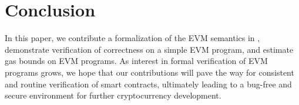 \section{Conclusion}
In this paper, we contribute a formalization of the EVM semantics in \K,
demonstrate verification of correctness on a simple EVM program, and estimate
gas bounds on EVM programs. As interest in formal verification of EVM programs
grows, we hope that our contributions will pave the way for consistent and
routine verification of smart contracts, ultimately leading to a bug-free and
secure environment for further cryptocurrency development.

